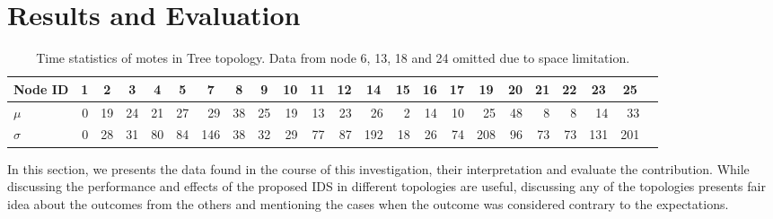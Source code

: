 \documentclass[conference,manuscript]{IEEEtran}
\newcommand*{\bd}[1]{\multicolumn{1}{|c|}{\bfseries #1}}
\begin{document}





\section{Results and Evaluation}
\label{sec:eval}

\begin{table}[t!]
\centering
\begin{tabular}{|l|*{21}{r|}r|}
\hline
\bd{Node ID}           & \bd{1} & \bd{2} & \bd{3} & \bd{4} & \bd{5} & \bd{7} & \bd{8} & \bd{9} & \bd{10} & \bd{11} & \bd{12} & \bd{14} & \bd{15} & \bd{16} & \bd{17} & \bd{19} & \bd{20} & \bd{21} & \bd{22} & \bd{23} & \bd{25}\\
\hline
$\mu$            & 0 & 19 & 24 & 21 & 27 & 29 & 38 & 25 & 19 & 13 & 23 & 26 & 2 & 14 & 10 & 25 & 48 & 8 & 8 & 14 & 33\\
$\sigma$		 & 0 & 28 & 31 & 80 & 84 & 146 & 38 & 32 & 29 & 77 & 87 & 192 & 18 & 26 & 74 & 208 & 96 & 73 & 73 & 131 & 201\\
\hline
\end{tabular}
\caption{Time statistics of motes in Tree topology. Data from node 6, 13, 18 and 24 omitted due to space limitation.}
\label{tab:stat_ellip}
\end{table}

In this section, we presents the data found in the course of this investigation, their interpretation and evaluate the contribution.
While discussing the performance and effects of the proposed IDS in different topologies are useful, discussing any of the topologies presents fair idea about the outcomes from the others and mentioning the cases when the outcome was considered  contrary to the expectations.

  
\end{document}
